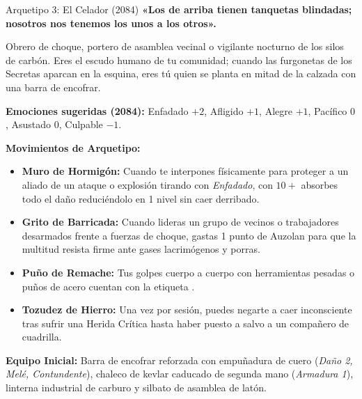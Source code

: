 \begin{FichaArquetipo}{Arquetipo 3: El Celador (2084)}
\textbf{«Los de arriba tienen tanquetas blindadas; nosotros nos tenemos los unos a los otros».}

Obrero de choque, portero de asamblea vecinal o vigilante nocturno de los silos de carbón. Eres el escudo humano de tu comunidad; cuando las furgonetas de los Secretas aparcan en la esquina, eres tú quien se planta en mitad de la calzada con una barra de encofrar.

\textbf{Emociones sugeridas (2084):} Enfadado $+2$, Afligido $+1$, Alegre $+1$, Pacífico $0$, Asustado $0$, Culpable $-1$.

\textbf{Movimientos de Arquetipo:}
\begin{itemize}
    \item \textbf{Muro de Hormigón:} Cuando te interpones físicamente para proteger a un aliado de un ataque o explosión tirando con \textit{Enfadado}, con $10+$ absorbes todo el daño reduciéndolo en 1 nivel sin caer derribado.
    \item \textbf{Grito de Barricada:} Cuando lideras un grupo de vecinos o trabajadores desarmados frente a fuerzas de choque, gastas 1 punto de Auzolan para que la multitud resista firme ante gases lacrimógenos y porras.
    \item \textbf{Puño de Remache:} Tus golpes cuerpo a cuerpo con herramientas pesadas o puños de acero cuentan con la etiqueta .
    \item \textbf{Tozudez de Hierro:} Una vez por sesión, puedes negarte a caer inconsciente tras sufrir una Herida Crítica hasta haber puesto a salvo a un compañero de cuadrilla.
\end{itemize}

\textbf{Equipo Inicial:} Barra de encofrar reforzada con empuñadura de cuero (\textit{Daño 2, Melé, Contundente}), chaleco de kevlar caducado de segunda mano (\textit{Armadura 1}), linterna industrial de carburo y silbato de asamblea de latón.
\end{FichaArquetipo}

\vspace{1em}


